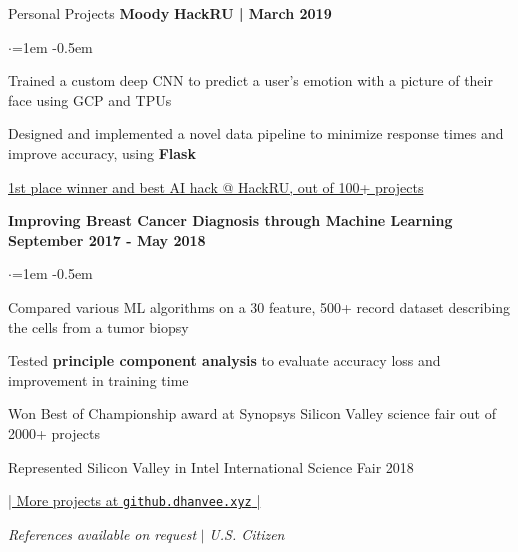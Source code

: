 \documentclass[mm,centered]{resume} %
\begin{document}
\begin{rSection}{Personal Projects}
{\bf Moody}  \hfill {\bf HackRU | March 2019}
 \begin{list}{$\cdot$}{\leftmargin=1em} %
   \itemsep -0.5em \vspace{-0.5em} %
	\item Trained a custom deep CNN to predict a user’s emotion with a picture of their face using GCP and TPUs
	\item Designed and implemented a novel data pipeline to minimize response times and improve accuracy, using \textbf{Flask}
	\item \underline{1st place winner and best AI hack @ HackRU, out of 100+ projects}
  \end{list}

{\bf Improving Breast Cancer Diagnosis through Machine Learning} \hfill {\bf September 2017 - May 2018}
 \begin{list}{$\cdot$}{\leftmargin=1em} %
   \itemsep -0.5em \vspace{-0.5em} %
	\item Compared various ML algorithms on a 30 feature, 500+ record dataset describing the cells from a tumor biopsy
	\item Tested \textbf{principle component analysis} to evaluate accuracy loss and improvement in training time
	\item Won Best of Championship award at Synopsys Silicon Valley science fair out of 2000+ projects
	\item Represented Silicon Valley in Intel International Science Fair 2018
  \end{list}

\vspace{-1.25mm}
\begin{center}
	\href{http://github.dhanvee.xyz}{| More projects at \texttt{github.dhanvee.xyz} |}
\end{center}
\vspace{-2mm}
\end{rSection}

\begin{center}
	\vspace{4mm}
	{\textit{References available on request} \hspace{1mm} $\vert$ \hspace{1mm} \textit{U.S. Citizen}}
\end{center}
\end{document}

